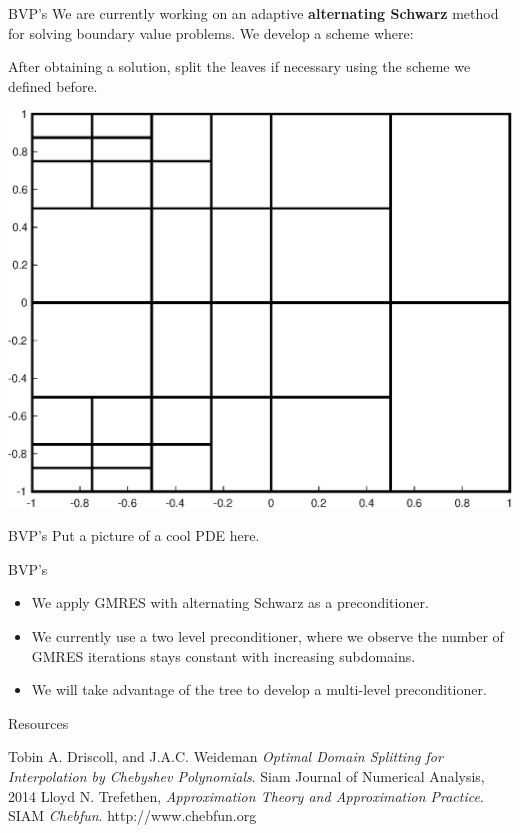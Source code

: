 \documentclass{beamer}
\begin{document}
\begin{frame}{BVP's}
		We are currently working on an adaptive \textbf{alternating Schwarz} method for solving boundary value problems. We develop a scheme where:
\bigskip

		After obtaining a solution, split the leaves if necessary using the scheme we defined before.
\bigskip

	\begin{center}
		\includegraphics[scale = 0.3]{zonePlot2.eps}
	\end{center}
\end{frame}

\begin{frame}{BVP's}
Put a picture of a cool PDE here.	
\end{frame}

\begin{frame}{BVP's}
\begin{itemize}
\item We apply GMRES with alternating Schwarz as a preconditioner.
\item We currently use a two level preconditioner, where we observe the number of GMRES iterations stays constant with increasing subdomains.
\item We will take advantage of the tree to develop a multi-level preconditioner.
\end{itemize}

\end{frame}

\begin{frame}{Resources}
\begin{thebibliography}{9}
Tobin A. Driscoll, and J.A.C. Weideman
\textit{Optimal Domain Splitting for Interpolation by Chebyshev Polynomials}. 
Siam Journal of Numerical Analysis, 2014
Lloyd N. Trefethen,
\textit{Approximation Theory and Approximation Practice}. 
SIAM
\textit{Chebfun}. 
http://www.chebfun.org
\end{thebibliography}
\end{frame}
\end{document}
